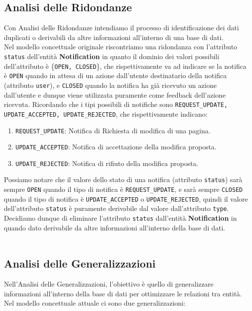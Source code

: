 \documentclass{article}
\begin{document}
	\subsection{Analisi delle Ridondanze}
	Con Analisi delle Ridondanze intendiamo il processo di identificazione dei dati duplicati o derivabili da altre informazioni all'interno di una base di dati.
	\\
	Nel modello concettuale originale riscontriamo una ridondanza con l'attributo \texttt{status} dell'entità \textbf{Notification} in quanto il dominio dei valori possibili dell'attributo è \{\texttt{OPEN, CLOSED}\}, che rispettivamente va ad indicare se la notifica è \texttt{OPEN} quando in attesa di un azione dall'utente destinatario della notifica (attributo \texttt{user}), e \texttt{CLOSED} quando la notifica ha già ricevuto un azione dall'utente e dunque viene utilizzata puramente come feedback dell'azione ricevuta.
	Ricordando che i tipi possibili di notifiche sono \texttt{REQUEST\_UPDATE, UPDATE\_ACCEPTED, UPDATE\_REJECTED}, che rispettivamente indicano:
	\begin{enumerate}
		\item \texttt{REQUEST\_UPDATE}: Notifica di Richiesta di modifica di una pagina.
		\item \texttt{UPDATE\_ACCEPTED}: Notifica di accettazione della modifica proposta.
		\item \texttt{UPDATE\_REJECTED}: Notifica di rifiuto della modifica proposta.
	\end{enumerate}
	
	Possiamo notare che il valore dello stato di una notifica (attributo \texttt{status}) sarà sempre \texttt{OPEN} quando il tipo di notifica è \texttt{REQUEST\_UPDATE}, e sarà sempre \texttt{CLOSED} quando il tipo di notifica è \texttt{UPDATE\_ACCEPTED} o \texttt{UPDATE\_REJECTED}, quindi il valore dell'attributo \texttt{status} è puramente derivabile dal valore dall'attributo \texttt{type}.
	Decidiamo dunque di eliminare l'attributo \texttt{status} dall'entità \textbf{Notification} in quando dato derivabile da altre informazioni all'interno della base di dati.
	\\\\
	
	\subsection{Analisi delle Generalizzazioni}
	Nell'Analisi delle Generalizzazioni, l'obiettivo è quello di generalizzare informazioni all'interno della base di dati per ottimizzare le relazioni tra entità.
	\\
	Nel modello concettuale attuale ci sono due generalizzazioni: 
	\\
	
\end{document}
